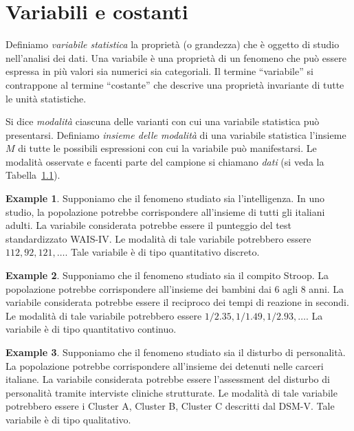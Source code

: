 \documentclass[
  11pt,
]{krantz}
\theoremstyle{definition}
\theoremstyle{definition}
\newtheorem{example}{Example}[chapter]
\theoremstyle{definition}
\theoremstyle{definition}
\theoremstyle{remark}
\begin{document}
\hypertarget{variabili-e-costanti}{%
\section{Variabili e costanti}\label{variabili-e-costanti}}

Definiamo \emph{variabile statistica} la proprietà (o grandezza) che è oggetto di studio nell'analisi dei dati. Una variabile è una proprietà di un fenomeno che può essere espressa in più valori sia numerici sia categoriali. Il termine ``variabile'' si contrappone al termine ``costante'' che descrive una proprietà invariante di tutte le unità statistiche.

Si dice \emph{modalità} ciascuna delle varianti con cui una variabile statistica può presentarsi. Definiamo \emph{insieme delle modalità} di una variabile statistica l'insieme \(M\) di tutte le possibili espressioni con cui la variabile può manifestarsi. Le modalità osservate e facenti parte del campione si chiamano \emph{dati} (si veda la Tabella~\protect\hyperlink{tab:term_st_desc}{1.1}).

\begin{example}
Supponiamo che il fenomeno studiato sia l'intelligenza. In uno studio, la popolazione potrebbe corrispondere all'insieme di tutti gli italiani adulti. La variabile considerata potrebbe essere il punteggio del test standardizzato WAIS-IV. Le modalità di tale variabile potrebbero essere \(112, 92, 121, \dots\). Tale variabile è di tipo quantitativo discreto.
\end{example}

\begin{example}
Supponiamo che il fenomeno studiato sia il compito Stroop. La popolazione potrebbe corrispondere all'insieme dei bambini dai 6 agli 8 anni. La variabile considerata potrebbe essere il reciproco dei tempi di reazione in secondi. Le modalità di tale variabile potrebbero essere \(1 / 2.35, 1/ 1.49, 1/2.93, \dots\). La variabile è di tipo quantitativo continuo.
\end{example}

\begin{example}
Supponiamo che il fenomeno studiato sia il disturbo di personalità. La popolazione potrebbe corrispondere all'insieme dei detenuti nelle carceri italiane. La variabile considerata potrebbe essere l'assessment del disturbo di personalità tramite interviste cliniche strutturate. Le modalità di tale variabile potrebbero essere i Cluster A, Cluster B, Cluster C descritti dal DSM-V. Tale variabile è di tipo qualitativo.
\end{example}
\end{document}

